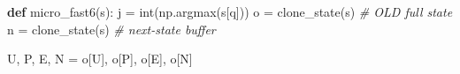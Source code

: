 \documentclass[
  a4paper,
]{article}
\newenvironment{Shaded}{}{}
\newcommand{\BuiltInTok}[1]{\textcolor[rgb]{0.00,0.50,0.00}{#1}}
\newcommand{\CommentTok}[1]{\textcolor[rgb]{0.38,0.63,0.69}{\textit{#1}}}
\newcommand{\KeywordTok}[1]{\textcolor[rgb]{0.00,0.44,0.13}{\textbf{#1}}}
\newcommand{\NormalTok}[1]{#1}
\newcommand{\OperatorTok}[1]{\textcolor[rgb]{0.40,0.40,0.40}{#1}}
\newcommand{\StringTok}[1]{\textcolor[rgb]{0.25,0.44,0.63}{#1}}
\begin{document}
\begin{Shaded}
\begin{Highlighting}[]
\KeywordTok{def}\NormalTok{ micro\_fast6(s):}
\NormalTok{    j }\OperatorTok{=} \BuiltInTok{int}\NormalTok{(np.argmax(s[}\StringTok{\textquotesingle{}q\textquotesingle{}}\NormalTok{]))}
\NormalTok{    o }\OperatorTok{=}\NormalTok{ clone\_state(s)          }\CommentTok{\# OLD full state}
\NormalTok{    n }\OperatorTok{=}\NormalTok{ clone\_state(s)          }\CommentTok{\# next{-}state buffer}

\NormalTok{    U, P, E, N }\OperatorTok{=}\NormalTok{ o[}\StringTok{\textquotesingle{}U\textquotesingle{}}\NormalTok{], o[}\StringTok{\textquotesingle{}P\textquotesingle{}}\NormalTok{], o[}\StringTok{\textquotesingle{}E\textquotesingle{}}\NormalTok{], o[}\StringTok{\textquotesingle{}N\textquotesingle{}}\NormalTok{]}


\end{Highlighting}
\end{Shaded}
\end{document}
